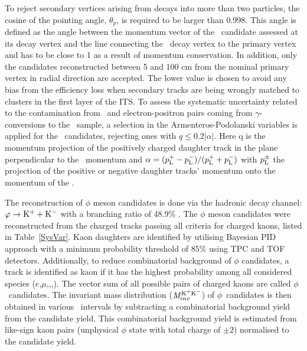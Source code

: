 \documentclass[ALICE,manyauthors]{cernphprep}
\begin{document}
To reject secondary vertices arising from decays into more than two particles, the cosine of the pointing angle, $\theta_{p}$, is required to be larger than 0.998. This angle is defined as the angle between the momentum vector of the \vo~candidate assessed at its decay vertex and the line connecting the \vo~decay vertex to the primary vertex and has to be close to 1 as a result of momentum conservation. In addition, only the candidates reconstructed between 5 and 100 cm from the nominal primary vertex in radial direction are accepted. The lower value is chosen to avoid any bias from the efficiency loss when secondary tracks are being wrongly matched to clusters in the first layer of the ITS. To assess the systematic uncertainty related to the contamination from \lambdas~and electron-positron pairs coming from $\gamma$-conversions to the \Ks~sample, a selection in the Armenteros-Podolanski variables \cite{doi:10.1080/14786440108520416} is applied for the \Ks~candidates, rejecting ones with $q\le 0.2|\alpha|$. Here q is the momentum projection of the positively charged daughter track in the plane perpendicular to the \vo~momentum and $\alpha = (p_{\rm{L}}^{+} - p_{\rm{L}}^{-})/(p_{\rm{L}}^{+} + p_{\rm{L}}^{-})$ with $p_{\rm{L}}^{\pm}$ the projection of the positive or negative daughter tracks' momentum onto the momentum of the
\vo.


The reconstruction of $\phi$ meson candidates is done via the hadronic decay channel: $\varphi \rightarrow {\rm K}^{+} + {\rm K}^{-}$ with a branching ratio of 48.9\% \cite{Olive_2016}. The $\phi$ meson candidates were reconstructed from the charged tracks passing all criteria for charged kaons, listed in Table~\ref{SysVar}. Kaon daughters are identified by utilising Bayesian PID approach \cite{Adam:2016acv} with a minimum probability threshold of $85\%$ using TPC and TOF detectors. Additionally, to reduce combinatorial background of $\phi$ candidates, a track is identified as kaon if it has the highest probability among all considered species ($e$,$\mu$,\pion,\kaon,\proton). The vector sum of all possible pairs of charged kaons are called $\phi$~candidates. The invariant mass distribution (${\it M}_{inv}^{\rm K^{+}K^{-}}$) of $\phi$~candidates is then obtained in various \pT~intervals by subtracting a combinatorial background yield from the candidate yield. This combinatorial background yield is estimated from like-sign kaon pairs (unphysical $\phi$ state with total charge of $\pm2$) normalised to the candidate yield. 
\end{document}

